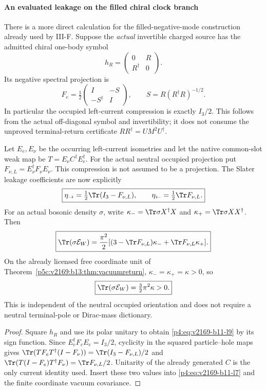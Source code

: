 \documentclass[12pt,a4paper]{article}
\begin{document}
\paragraph{An evaluated leakage on the filled chiral clock branch}
There is a more direct calculation for the filled-negative-mode construction
already used by III-F. Suppose the \emph{actual} invertible charged source
has the admitted chiral one-body symbol
\[
 h_R=\begin{pmatrix}0&R\\R^\dagger&0\end{pmatrix}.
\]
Its negative spectral projection is
\begin{equation}
 F_e=\tfrac12\begin{pmatrix}I&-S\\-S^\dagger&I\end{pmatrix},
 \qquad S=R(R^\dagger R)^{-1/2}.
 \label{p4:eq:v2169-b11-l9}
\end{equation}
In particular the occupied left-current compression is exactly $I_3/2$.
This follows from the actual off-diagonal symbol and invertibility; it does
not consume the unproved terminal-return certificate
$RR^\dagger=UM^2U^\dagger$.

Let $E_e,E_\nu$ be the occurring left-current isometries and let the native
common-slot weak map be $T=E_\nu C^\dagger E_e^\dagger$. For the actual
neutral occupied projection put $F_{\nu,L}=E_\nu^\dagger F_\nu E_\nu$.
This compression is not assumed to be a projection. The Slater leakage
coefficients are now explicitly
\begin{equation}
 \boxed{\eta_\to=\tfrac12\Tr(I_3-F_{\nu,L}),\qquad
        \eta_\leftarrow=\tfrac12\Tr F_{\nu,L}.} \label{p4:eq:v2169-b11-l10}
\end{equation}
For an actual bosonic density $\sigma$, write
$\kappa_-=\Tr\sigma X^\dagger X$ and $\kappa_+=\Tr\sigma XX^\dagger$. Then
\begin{equation}
 \boxed{\Tr(\sigma\mathcal E_W)
  =\frac{\pi^2}{2}
    [(3-\Tr F_{\nu,L})\kappa_-+\Tr F_{\nu,L}\kappa_+].} \label{p4:eq:v2169-b11-l11}
\end{equation}
On the already licensed free coordinate unit of Theorem~\ref{p5c:v2169:b13:thm:vacuumreturn},
$\kappa_-=\kappa_+=\kappa>0$, so
\begin{equation}
 \boxed{\Tr(\sigma\mathcal E_W)=\tfrac32\pi^2\kappa>0.} \label{p4:eq:v2169-b11-l12}
\end{equation}
This is independent of the neutral occupied orientation and does not require
a neutral terminal-pole or Dirac-mass dictionary.
\begin{proof}
Square $h_R$ and use its polar unitary to obtain \eqref{p4:eq:v2169-b11-l9} by its sign function.
Since $E_e^\dagger F_eE_e=I_3/2$, cyclicity in the squared particle--hole
maps gives
$\Tr(TF_eT^\dagger(I-F_\nu))=\Tr(I_3-F_{\nu,L})/2$ and
$\Tr(T(I-F_e)T^\dagger F_\nu)=\Tr F_{\nu,L}/2$.
Unitarity of the already generated $C$ is the only current identity used.
Insert these two values into \eqref{p4:eq:v2169-b11-l7} and the finite coordinate vacuum covariance.
\end{proof}
\end{document}
